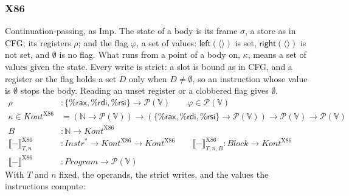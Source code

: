 \documentclass[10pt]{article}
\theoremstyle{acmplain}
\newcommand{\SEM}[1]{\llbracket #1 \rrbracket}
\newcommand{\key}[1]{\mathsf{#1}}
\newcommand{\SET}[1]{\mathcal{P}(#1)}
\newcommand{\V}{\mathbb{V}}
\newcommand{\Left}[1]{\key{left}(#1)}
\newcommand{\Right}[1]{\key{right}(#1)}
\newcommand{\emptytup}{\langle\rangle}
\newcommand{\NE}{\neq\emptyset}
\newcommand{\rax}{\%\key{rax}}
\newcommand{\rdi}{\%\key{rdi}}
\newcommand{\rsi}{\%\key{rsi}}
\begin{document}
\subsubsection{X86}\label{sec:den-x86}

Continuation-passing, as Imp. The state of a body is its frame $\sigma$,
a store as in CFG; its registers $\rho$; and the flag $\varphi$, a set of
values: $\Left{\emptytup}$ is set, $\Right{\emptytup}$ is not set, and
$\emptyset$ is no flag. What runs from a point of a body on, $\kappa$,
means a set of values given the state. Every write is strict: a slot is
bound as in CFG, and a register or the flag holds a set $D$ only when
$D \NE$, so an instruction whose value is $\emptyset$ stops the body.
Reading an unset register or a clobbered flag gives $\emptyset$.
\begin{align*}
  \rho &: \{\rax, \rdi, \rsi\} \to \SET{\V} \qquad \varphi \in \SET{\V} \\
  \kappa \in \mathit{Kont}^{\mathrm{X86}} &= (\mathbb{N} \to \SET{\V}) \to (\{\rax, \rdi, \rsi\} \to \SET{\V}) \to \SET{\V} \to \SET{\V} \\
  B &: \mathbb{N} \to \mathit{Kont}^{\mathrm{X86}} \\
  \SEM{-}^{\mathrm{X86}}_{T,n} &: \mathit{Instr}^* \to \mathit{Kont}^{\mathrm{X86}} \to \mathit{Kont}^{\mathrm{X86}} \qquad
  \SEM{-}^{\mathrm{X86}}_{T,n,B} : \mathit{Block} \to \mathit{Kont}^{\mathrm{X86}} \\
  \SEM{-}^{\mathrm{X86}} &: \mathit{Program} \to \SET{\V}
\end{align*}
With $T$ and $n$ fixed, the operands, the strict writes, and the values
the instructions compute:
\end{document}
